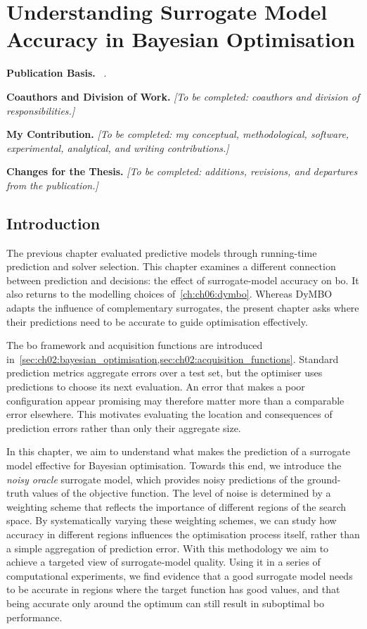 \chapter{Understanding Surrogate Model Accuracy in Bayesian Optimisation}
\label{ch:ch08:noisy_oracle}

\begingroup\small
\noindent\textbf{Publication Basis.} ~\citep{ShaHoo25}.\par
\noindent\textbf{Coauthors and Division of Work.} \emph{[To be completed: coauthors and division of responsibilities.]}\par
\noindent\textbf{My Contribution.} \emph{[To be completed: my conceptual, methodological, software, experimental, analytical, and writing contributions.]}\par
\noindent\textbf{Changes for the Thesis.} \emph{[To be completed: additions, revisions, and departures from the publication.]}\par
\endgroup\medskip

\section{Introduction}

The previous chapter evaluated predictive models through running-time prediction and solver selection. This chapter examines a different connection between prediction and decisions: the effect of surrogate-model accuracy on \Gls{bo}. It also returns to the modelling choices of~\cref{ch:ch06:dymbo}. Whereas DyMBO adapts the influence of complementary surrogates, the present chapter asks where their predictions need to be accurate to guide optimisation effectively.

The \gls{bo} framework and acquisition functions are introduced in~\cref{sec:ch02:bayesian_optimisation,sec:ch02:acquisition_functions}. Standard prediction metrics aggregate errors over a test set, but the optimiser uses predictions to choose its next evaluation. An error that makes a poor configuration appear promising may therefore matter more than a comparable error elsewhere. This motivates evaluating the location and consequences of prediction errors rather than only their aggregate size.

In this chapter, we aim to understand what makes the prediction of a surrogate model effective for Bayesian optimisation.
Towards this end, we introduce the \textit{noisy oracle} surrogate model,
which provides noisy predictions of the ground-truth values of the objective function. The level of noise is determined by a weighting scheme that reflects the importance of different regions of the search space. By systematically varying these weighting schemes, we can study how accuracy in different regions influences the optimisation process itself, rather than a simple aggregation of prediction error. With this methodology we aim to achieve a targeted view of surrogate-model quality.
Using it in a series of computational experiments, we find evidence that a good surrogate model needs to be accurate in regions where the target function has good values, and that being accurate only around the optimum can still result in suboptimal \gls{bo} performance.

